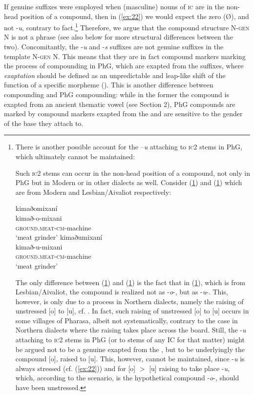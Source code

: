 \documentclass[output=paper]{LSP/langsci}
\begin{document}
If genuine  suffixes were employed when (masculine) nouns of \textsc{ic} are in the non-head position of a compound, then in (\ref{ex:22}) we would expect the zero   (\O), and not -\textit{u}, contrary to fact.\footnote{There is another possible account for the –\textit{u} attaching to \textsc{ic2} stems in PhG, which ultimately cannot be maintained:

Such \textsc{ic2} stems can occur in the non-head position of a compound, not only in PhG but in Modern  or in other dialects as well. Consider (\ref{ex:10i}) and (\ref{ex:10ii}) which are from Modern  and Lesbian/Aivaliot respectively:
\begin{multicols}{2}
\ea\label{ex:10i}
	\glll 	kimaðomixaní\\
			kimað-o-mixani\\
			\textsc{ground.meat-cm}-machine\\
	\glt	`meat grinder'
\z
\ea\label{ex:10ii}
	\glll	kimaðumixaní\\
			kimað-u-mixani\\
			\textsc{ground.meat-cm}-machine\\
	\glt	`meat grinder'
\z
\end{multicols}
The only difference between (\ref{ex:10i}) and (\ref{ex:10ii}) is the fact that in (\ref{ex:10ii}), which is from Lesbian/Aivaliot, the compound  is realized not as -\textit{o}-, but as -\textit{u}-. This, however, is only due to a  process in Northern  dialects, namely the raising of unstressed [o] to [u], cf. \citet{Chatzidakis1905}. In fact, such raising of unstressed [o] to [u] occurs in some villages of Pharasa, albeit not systematically, contrary to the case in Northern  dialects where the raising takes place across the board. Still, the -\textit{u} attaching to \textsc{ic2} stems in PhG (or to stems of any IC for that matter) might be argued not to be a genuine  exapted from the , but to be underlyingly the compound  [o], raised to [u]. This, however, cannot be maintained, since -\textit{u} is always stressed (cf. (\ref{ex:22})) and for [o] $>$ [u]  raising to take place -\textit{u}, which, according to the scenario, is the hypothetical compound  -\textit{o}-, should have been unstressed.
} Therefore, we argue that the compound structure N-\textsc{gen} N is not a  phrase (see also  below for more structural differences between the two). Concomitantly, the -\textit{u} and -\textit{s} suffixes are not genuine  suffixes in the template N-\textsc{gen} N. This means that they are in fact compound markers marking the process of compounding in PhG, which are exapted from the  suffixes, where \textit{exaptation} should be defined as an unpredictable and leap-like shift of the function of a specific morpheme (\citealt[8]{Nordevandevelde2016}). This is another difference between  compounding and PhG compounding: while in the former the compound  is exapted from an ancient thematic vowel (see Section 2), PhG compounds are marked by compound markers exapted from the  and are sensitive to the gender of the base they attach to. 
\end{document}
